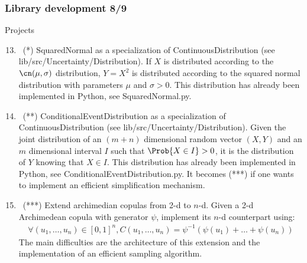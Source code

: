 \documentclass[8pt]{beamer}
\begin{document}
\begin{frame}
  \frametitle{Library development 8/9}
  \begin{block}{Projects}
    \begin{enumerate}
      \setcounter{enumi}{12}
    \item~(*) \alert{\ttfamily SquaredNormal} as a specialization of {\ttfamily ContinuousDistribution} (see {\ttfamily lib/src/Uncertainty/Distribution}). If $X$ is distributed according to the $\cn(\mu,\sigma)$ distribution, $Y=X^2$ is distributed according to the squared normal distribution with parameters $\mu$ and $\sigma>0$. This distribution has already been implemented in Python, see {\ttfamily SquaredNormal.py}.
    \item~(**) \alert{\ttfamily ConditionalEventDistribution} as a specialization of {\ttfamily ContinuousDistribution} (see {\ttfamily lib/src/Uncertainty/Distribution}). Given the joint distribution of an $(m+n)$ dimensional random vector $(X,Y)$ and an $m$ dimensional interval $I$ such that $\Prob{X\in I}>0$, it is the distribution of $Y$ knowing that $X\in I$. This distribution has already been implemented in Python, see {\ttfamily ConditionalEventDistribution.py}. It becomes (***) if one wants to implement an efficient simplification mechanism.
    \item~(***) Extend archimedian copulas from 2-d to $n$-d. Given a 2-d Archimedean copula with generator $\psi$, implement its $n$-d counterpart using:
      \begin{align}
        \forall (u_1,\dots,u_n)\in[0,1]^n, C(u_1,\dots,u_n)=\psi^{-1}\left(\psi(u_1)+\dots+\psi(u_n)\right)
      \end{align}
      The main difficulties are the architecture of this extension and the implementation of an efficient sampling algorithm.
    \end{enumerate}
  \end{block}
\end{frame}
\end{document}
